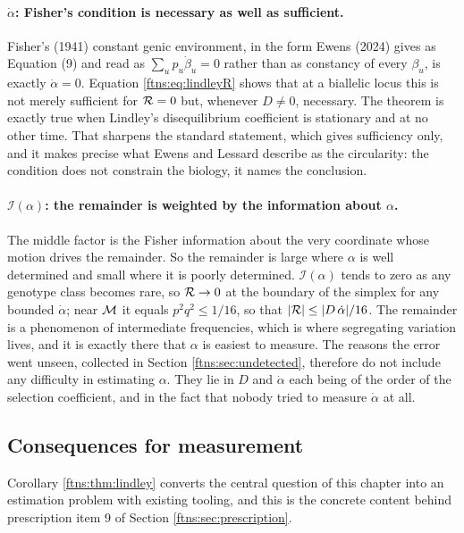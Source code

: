 \paragraph{$\dot\alpha$: Fisher's condition is necessary as well as sufficient.} Fisher's (1941)
constant genic environment, in the form Ewens (2024) gives as Equation (9) and read as $\sum_up_u\dot\beta_u=0$ rather than as constancy of every $\beta_u$, is exactly
$\dot\alpha=0$. Equation \eqref{ftns:eq:lindleyR} shows that at a biallelic locus this is not merely
sufficient for $\mathcal{R}=0$ but, whenever $D\neq0$, necessary. The theorem is exactly true when Lindley's
disequilibrium coefficient is stationary and at no other time. That sharpens the standard
statement, which gives sufficiency only, and it makes precise what Ewens and Lessard describe as
the circularity: the condition does not constrain the biology, it names the conclusion.

\paragraph{$\mathcal{I}(\alpha)$: the remainder is weighted by the information about $\alpha$.}
The middle factor is the Fisher information about the very coordinate whose motion drives the
remainder. So the remainder is large where $\alpha$ is well determined and small where it is
poorly determined. $\mathcal{I}(\alpha)$ tends to zero as any genotype class becomes rare, so
$\mathcal{R}\to0$ at the boundary of the simplex for any bounded $\dot\alpha$; near $\mathcal{M}$ it equals $p^2q^2\le1/16$, so that
$|\mathcal{R}|\le|D\,\dot\alpha|/16$. The remainder is a phenomenon of intermediate frequencies, which is
where segregating variation lives, and it is exactly there that $\alpha$ is easiest to measure.
The reasons the error went unseen, collected in Section \ref{ftns:sec:undetected}, therefore do not
include any difficulty in estimating $\alpha$. They lie in $D$ and $\dot\alpha$ each being of the
order of the selection coefficient, and in the fact that nobody tried to measure $\dot\alpha$ at all.

\subsection{Consequences for measurement}

Corollary \ref{ftns:thm:lindley} converts the central question of this chapter into an estimation
problem with existing tooling, and this is the concrete content behind prescription item 9 of
Section \ref{ftns:sec:prescription}.

